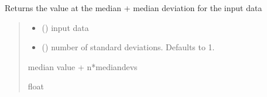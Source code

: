 \documentclass[letterpaper,10pt,english]{sphinxmanual}
\begin{document}
\begin{fulllineitems}
\label{\detokenize{micropolarray:micropolarray.utils.median_plus_std}}
\pysigstartsignatures
{}
\pysigstopsignatures
\sphinxAtStartPar
Returns the value at the median + median deviation for the input data
\begin{quote}\begin{description}
\begin{itemize}
\item {} 
\sphinxAtStartPar
{} () \textendash{} input data

\item {} 
\sphinxAtStartPar
{} (\sphinxstyleliteralemphasis{\sphinxupquote{, }}) \textendash{} number of standard deviations. Defaults to 1.

\end{itemize}

\sphinxAtStartPar
median value + n*mediandevs

\sphinxAtStartPar
float

\end{description}\end{quote}

\end{fulllineitems}


\begin{fulllineitems}
\label{\detokenize{micropolarray:micropolarray.utils.normalize2pi}}
\pysigstartsignatures
{}
\pysigstopsignatures
\end{fulllineitems}
\end{document}
